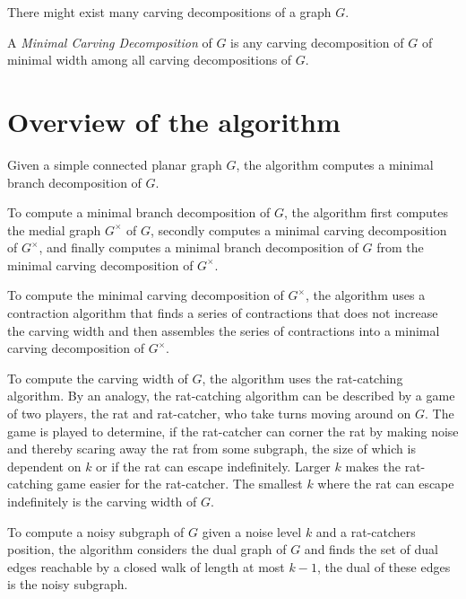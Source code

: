 \documentclass{article}
\begin{document}
	There might exist many carving decompositions of a graph $G$.

	A \textit{Minimal Carving Decomposition} of $G$ is any carving decomposition of $G$ of minimal width among all carving decompositions of $G$.


\section{Overview of the algorithm}

	Given a simple connected planar graph $G$, the algorithm computes a minimal branch decomposition of $G$.

	To compute a minimal branch decomposition of $G$, the algorithm first computes the medial graph $G^\times$ of $G$, secondly computes a minimal carving decomposition of $G^\times$, and finally computes a minimal branch decomposition of $G$ from the minimal carving decomposition of $G^\times$.

	To compute the minimal carving decomposition of $G^\times$, the algorithm uses a contraction algorithm that finds a series of contractions that does not increase the carving width and then assembles the series of contractions into a minimal carving decomposition of $G^\times$.

	To compute the carving width of $G$, the algorithm uses the rat-catching algorithm. By an analogy, the rat-catching algorithm can be described by a game of two players, the rat and rat-catcher, who take turns moving around on $G$. The game is played to determine, if the rat-catcher can corner the rat by making noise and thereby scaring away the rat from some subgraph, the size of which is dependent on $k$ or if the rat can escape indefinitely. Larger $k$ makes the rat-catching game easier for the rat-catcher. The smallest $k$ where the rat can escape indefinitely is the carving width of $G$.

	To compute a noisy subgraph of $G$ given a noise level $k$ and a rat-catchers position, the algorithm considers the dual graph of $G$ and finds the set of dual edges reachable by a closed walk of length at most $k-1$, the dual of these edges is the noisy subgraph.
\end{document}

